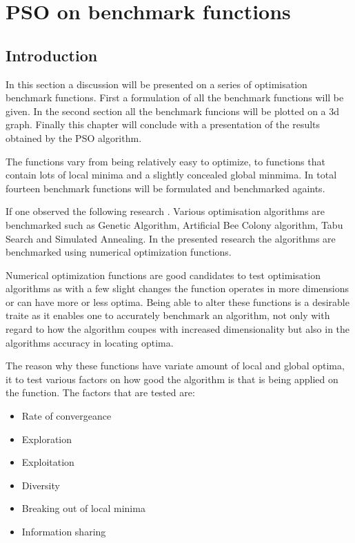 \chapter{PSO on benchmark functions}
\label{chpt:benchmark}
\section{Introduction}
In this section a discussion will be presented on a series of optimisation benchmark functions. First a formulation of all the benchmark functions will be given. In the second section all the benchmark funcions will be plotted on a 3d graph. Finally this chapter will conclude with a presentation of the results obtained by the PSO algorithm.

The functions vary from being relatively easy to optimize, to functions that contain lots of local minima and a slightly concealed global minmima. In total fourteen benchmark functions will be formulated and benchmarked againts.

If one observed the following research \cite{devparallelgasa,CompuIntelligenceIntro,FundamentalSwarm}. Various optimisation algorithms are benchmarked such as Genetic Algorithm, Artificial Bee Colony algorithm, Tabu Search and Simulated Annealing. In the presented research the algorithms are benchmarked using numerical optimization functions.

Numerical optimization functions are good candidates to test optimisation algorithms as with a few slight changes the function operates in more dimensions or can have more or less optima\cite{devparallelgasa,CompuIntelligenceIntro,FundamentalSwarm}. Being able to alter these functions is a desirable traite as it enables one to accurately benchmark an algorithm, not only with regard to how the algorithm coupes with increased dimensionality but also in the algorithms accuracy in locating optima\cite{devparallelgasa,CompuIntelligenceIntro,FundamentalSwarm}.

The reason why these functions have variate amount of local and global optima, it to test various factors on how good the algorithm is that is being applied on the function. The factors that are tested are\cite{CompuIntelligenceIntro,FundamentalSwarm}:
\begin{itemize}
\item Rate of convergeance
\item Exploration
\item Exploitation
\item Diversity
\item Breaking out of local minima
\item Information sharing
\end{itemize}

